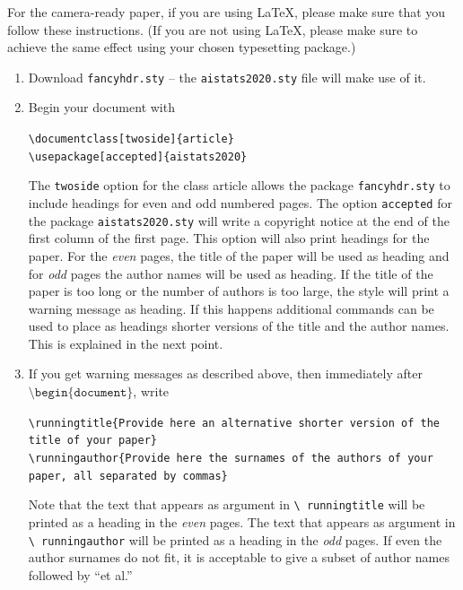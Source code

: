 \documentclass[twoside]{article}
\theoremstyle{plain}
\theoremstyle{definition}
\begin{document}
For the camera-ready paper, if you are using \LaTeX, please make sure
that you follow these instructions.  (If you are not using \LaTeX,
please make sure to achieve the same effect using your chosen
typesetting package.)

\begin{enumerate}
    \item Download \texttt{fancyhdr.sty} -- the
    \texttt{aistats2020.sty} file will make use of it.
    \item Begin your document with
    \begin{flushleft}
    \texttt{\textbackslash documentclass[twoside]\{article\}}\\
    \texttt{\textbackslash usepackage[accepted]\{aistats2020\}}
    \end{flushleft}
    The \texttt{twoside} option for the class article allows the
    package \texttt{fancyhdr.sty} to include headings for even and odd
    numbered pages. The option \texttt{accepted} for the package
    \texttt{aistats2020.sty} will write a copyright notice at the end of
    the first column of the first page. This option will also print
    headings for the paper.  For the \emph{even} pages, the title of
    the paper will be used as heading and for \emph{odd} pages the
    author names will be used as heading.  If the title of the paper
    is too long or the number of authors is too large, the style will
    print a warning message as heading. If this happens additional
    commands can be used to place as headings shorter versions of the
    title and the author names. This is explained in the next point.
    \item  If you get warning messages as described above, then
    immediately after $\texttt{\textbackslash
    begin\{document\}}$, write
    \begin{flushleft}
    \texttt{\textbackslash runningtitle\{Provide here an alternative
    shorter version of the title of your paper\}}\\
    \texttt{\textbackslash runningauthor\{Provide here the surnames of
    the authors of your paper, all separated by commas\}}
    \end{flushleft}
    Note that the text that appears as argument in \texttt{\textbackslash
      runningtitle} will be printed as a heading in the \emph{even}
    pages. The text that appears as argument in \texttt{\textbackslash
      runningauthor} will be printed as a heading in the \emph{odd}
    pages.  If even the author surnames do not fit, it is acceptable
    to give a subset of author names followed by ``et al.''


\end{enumerate}
\end{document}
